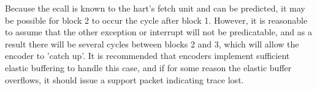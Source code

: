Because the ecall is known to the hart's fetch unit and can be predicted, it may be possible for block 2 to occur the cycle 
after block 1.  However, it is reasonable to assume that the other exception or interrupt will not be predicatable, and as a result
there will be several cycles between blocks 2 and 3, which will allow the encoder to 'catch up'.  It is recommended that encoders
implement sufficient elastic buffering to handle this case, and if for some reason the elastic buffer overflows, it should
issue a support packet indicating trace lost.
